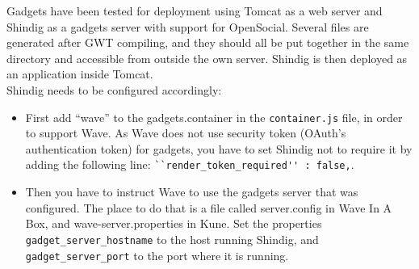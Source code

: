 Gadgets have been tested for deployment using Tomcat as a web server and Shindig as a gadgets server with support for OpenSocial. Several files are generated after GWT compiling, and they should all be put together in the same directory and accessible from outside the own server. Shindig is then deployed as an application inside Tomcat.\\[.2cm]
Shindig needs to be configured accordingly:
\begin{itemize}
  \item First add ``wave'' to the gadgets.container in the \verb|container.js| file, in order to support Wave. As Wave does not use security token (OAuth's authentication token) for gadgets, you have to set Shindig not to require it by adding the following line: \verb|``render_token_required'' : false,|.
  \item Then you have to instruct Wave to use the gadgets server that was configured. The place to do that is a file called server.config in Wave In A Box, and wave-server.properties in Kune. Set the properties \verb|gadget_server_hostname| to the host running Shindig, and \verb|gadget_server_port| to the port where it is running.
\end{itemize}

